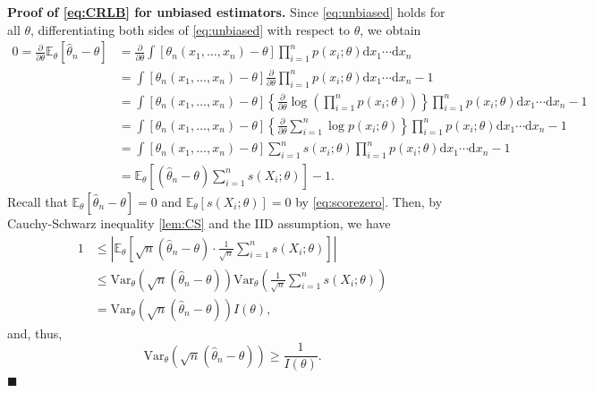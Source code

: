 \documentclass[10.5pt, A4paper, openany, uplatex]{book}
\newcommand{\mrm}{\mathrm}
\newcommand{\E}{\mathbb{E}}
\newcommand{\Var}{\mathrm{Var}}
\renewcommand{\hat}{\widehat}
\numberwithin{equation}{section}
\begin{document}
\textbf{Proof of \eqref{eq:CRLB} for unbiased estimators.} \quad Since \eqref{eq:unbiased} holds for all $\theta$, differentiating both sides of \eqref{eq:unbiased} with respect to $\theta$, we obtain
\begin{align*}
	0 = \frac{\partial }{\partial \theta}\E_\theta[\hat \theta_n - \theta]
	& = \frac{\partial}{\partial \theta} \int [\theta_n(x_1, \ldots , x_n) - \theta] \prod_{i=1}^n p(x_i; \theta) \mrm{d}x_1 \cdots  \mrm{d}x_n\\
	& = \int [\theta_n(x_1, \ldots , x_n) - \theta] \frac{\partial}{\partial \theta} \prod_{i=1}^n p(x_i; \theta) \mrm{d}x_1 \cdots  \mrm{d}x_n - 1\\
	& = \int [\theta_n(x_1, \ldots , x_n) - \theta]  \left\{ \frac{\partial}{\partial \theta} \log\left( \prod_{i=1}^n p(x_i; \theta) \right) \right\} \prod_{i=1}^n p(x_i; \theta) \mrm{d}x_1 \cdots  \mrm{d}x_n - 1 \\
	& = \int [\theta_n(x_1, \ldots , x_n) - \theta]  \left\{\frac{\partial}{\partial \theta}\sum_{i=1}^n  \log p(x_i; \theta) \right\}\prod_{i=1}^n p(x_i; \theta) \mrm{d}x_1 \cdots  \mrm{d}x_n - 1 \\
	& = \int [\theta_n(x_1, \ldots , x_n) - \theta]  \sum_{i=1}^n s(x_i; \theta) \prod_{i=1}^n p(x_i; \theta) \mrm{d}x_1 \cdots  \mrm{d}x_n - 1\\
	& = \E_\theta\left[ (\hat \theta_n- \theta)  \sum_{i=1}^n s(X_i; \theta)  \right] - 1.
\end{align*}
Recall that $\E_\theta[\hat \theta_n- \theta] = 0$ and $\E_\theta\left[ s(X_i; \theta)  \right] = 0$ by \eqref{eq:scorezero}.
Then, by Cauchy-Schwarz inequality \ref{lem:CS} and the IID assumption, we have
\begin{align*}
	1 
	& \le \left| \E_\theta\left[ \sqrt{n}(\hat \theta_n- \theta) \cdot \frac{1}{\sqrt{n}}  \sum_{i=1}^n s(X_i; \theta)  \right] \right|\\
	& \le \Var_\theta\left( \sqrt{n}(\hat \theta_n- \theta) \right) \Var_\theta\left(\frac{1}{\sqrt{n}}\sum_{i=1}^n s(X_i; \theta) \right)\\
	& = \Var_\theta\left(\sqrt{n}(\hat \theta_n- \theta) \right) I(\theta),
\end{align*}
and, thus,
\[
	\Var_\theta\left(\sqrt{n}(\hat \theta_n- \theta) \right) \ge \frac{1}{I(\theta)}.
\]
$\blacksquare$
\end{document}

